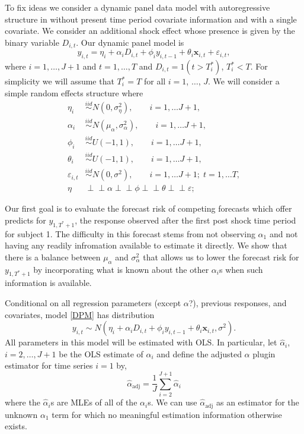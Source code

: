 \documentclass[11pt]{article}
\newcommand{\x}{\textbf{x}}
\newcommand{\indep}{\perp\!\!\!\perp}
\begin{document}
To fix ideas we consider a dynamic panel data model with autoregressive 
structure in \citet{blundell1998initial} without present time period covariate 
information and with a single covariate.  We consider an additional shock 
effect whose presence is given by the binary variable $D_{i,t}$.  Our dynamic 
panel model is  
\begin{equation} \label{DPM}
  y_{i,t} = \eta_i + \alpha_iD_{i,t} + \phi_i y_{i,t-1} + \theta_i \x_{i,t} 
    + \varepsilon_{i,t}, 
\end{equation}
where $i = 1,\ldots,J+1$ and $t = 1,\ldots,T$ and $D_{i,t} = 1(t > T_i^*)$, 
$T_i^* < T$.  For simplicity we will assume that $T_i^* = T$ for all $i = 1$,
$\ldots$, $J$.  We will consider a simple random effects structure where 
\begin{align*}
  \eta_i &\overset{iid}{\sim} N(0, \sigma_\eta^2), 
    \qquad i = 1,\ldots J+1, \\
  \alpha_i &\overset{iid}{\sim} N(\mu_\alpha, \sigma_\alpha^2), 
    \qquad i = 1,\ldots J+1, \\
  \phi_i &\overset{iid}{\sim} U(-1,1), 
    \qquad i = 1,\ldots J+1, \\
  \theta_i &\overset{iid}{\sim} U(-1,1), 
    \qquad i = 1,\ldots J+1, \\
  \varepsilon_{i,t} &\overset{iid}{\sim} N(0, \sigma^2), 
    \qquad i = 1,\ldots J+1;\; t = 1, \ldots T, \\
  \eta &\indep \alpha \indep \phi \indep \theta \indep \varepsilon;
\end{align*}

Our first goal is to evaluate the forecast risk of competing forecasts which 
offer predicts for $y_{1, T^* + 1}$, the response observed after the first 
post shock time period for subject 1.  The difficulty in this forecast stems 
from not observing $\alpha_1$ and not having any readily infromation available 
to estimate it directly.  We show that there is a balance between $\mu_\alpha$ 
and $\sigma_\alpha^2$ that allows us to lower the forecast risk for 
$y_{1, T^* + 1}$ by incorporating what is known about the other $\alpha_i$s 
when such information is available.

Conditional on all regression parameters 
(except $\alpha$?), previous responses, and covariates, model \eqref{DPM} 
has distribution 
$$
  y_{i,t} 
    \sim N(\eta_i + \alpha_iD_{i,t} + \phi_i y_{i,t-1} + \theta_i\x_{i,t}, \sigma^2).
$$
All parameters in this model will be estimated with OLS. In particular, let 
$\hat{\alpha}_i$, $i = 2,\ldots,J+1$ be the OLS estimate of $\alpha_i$ 
and define the adjusted $\alpha$ plugin estimator for time series $i=1$ by,
\begin{equation} \label{adjusted}
  \hat{\alpha}_{\text{adj}} = \frac{1}{J}\sum_{i=2}^{J+1}\hat{\alpha}_i
\end{equation}
where the $\hat{\alpha}_i$s are MLEs of all of the $\alpha_i$s.  
We can use $\hat{\alpha}_{\text{adj}}$ as an estimator for the unknown 
$\alpha_1$ term for which no meaningful estimation information otherwise 
exists. 
\end{document}
